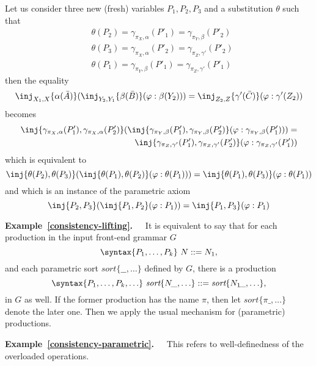 \documentclass{article}
\theoremstyle{definition}
\theoremstyle{definition}
\theoremstyle{definition}
\theoremstyle{definition}
\theoremstyle{definition}
\theoremstyle{theorem}
\theoremstyle{theorem}
\theoremstyle{theorem}
\theoremstyle{theorem}
\theoremstyle{theorem}
\newcommand{\Sort}[1]{\textit{sort}\{#1\}}
\begin{document}
\begin{enumerate}[label=(\arabic*)]
{Let us consider three new (fresh) variables $P_1,P_2,P_3$ and a substitution $\theta$ such that
\begin{align*}
&\theta(P_2) = \gamma_{\pi_X,\alpha}(P'_1)=\gamma_{\pi_Y,\beta}(P'_2)\\
&\theta(P_3)= \gamma_{\pi_X,\alpha}(P'_2)=\gamma_{\pi_Z,\gamma'}(P'_2)\\
&\theta(P_1)= \gamma_{\pi_Y,\beta}(P'_1)=\gamma_{\pi_Z,\gamma'}(P'_1)
\end{align*}
then the equality
\[\inj_{X_1,X}\{\alpha(\bar{A})\}(
  \inj_{Y_2,Y_1}\{\beta(\bar{B})\}(\varphi:\beta(Y_2)))
 = \inj_{Z_2,Z}\{\gamma'(\bar{C})\}(\varphi:\gamma'(Z_2))\]
becomes
\[
\begin{split}
\inj\{\gamma_{\pi_X,\alpha}(P'_1), \gamma_{\pi_X,\alpha}(P'_2)\}(\inj\{\gamma_{\pi_Y,\beta}(P'_1),\gamma_{\pi_Y,\beta}(P'_2)\}(\varphi:\gamma_{\pi_Y,\beta}(P'_1)))=\\
\inj\{\gamma_{\pi_Z,\gamma'}(P'_1),\gamma_{\pi_Z,\gamma'}(P'_2)\}(\varphi:\gamma_{\pi_Z,\gamma'}(P'_1))
\end{split}
\]
which is equivalent to
\[
\inj\{\theta(P_2),\theta(P_3)\}(\inj\{\theta(P_1),\theta(P_2)\}(\varphi:\theta(P_1)))=
\inj\{\theta(P_1),\theta(P_3)\}(\varphi:\theta(P_1))
\]
and which is an instance of the parametric axiom
\[
\inj\{P_2,P_3\}(\inj\{P_1,P_2\}(\varphi:P_1))=\inj\{P_1,P_3\}(\varphi:P_1)
\]

\textbf{Example~\ref{consistency-lifting}.~~}
It is equivalent to say that for each production in the input front-end grammar $G$
\[\syntax\{P_1,\ldots,P_k\}\ N::=N_1,\]
and each parametric sort \(\Sort{\_\!\_,\ldots}\) defined by $G$, there is a production
\[\syntax\{P_1,\ldots,P_k,\ldots\}\ \Sort{N\!\_,\ldots}::=\Sort{N_1\!\_,\ldots},\]
in $G$ as well. 
If the former production has the name $\pi$, then let $\Sort{\pi\!\_,\ldots}$ denote the later one.
Then we apply the usual mechanism for (parametric) productions.


\textbf{Example~\ref{consistency-parametric}.~~}
This refers to well-definedness of the overloaded operations.

}
\end{enumerate}
\end{document}
